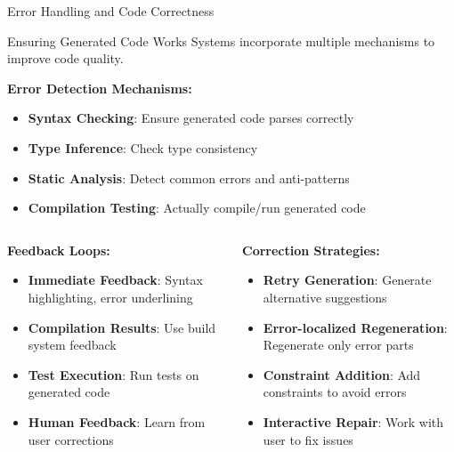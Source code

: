 \documentclass{beamer}
\begin{document}
\begin{frame}[t]{Error Handling and Code Correctness}
    \begin{block}{Ensuring Generated Code Works}
        Systems incorporate multiple mechanisms to improve code quality.
    \end{block}
    
    \textbf{Error Detection Mechanisms:}
    \begin{itemize}
        \item \textbf{Syntax Checking}: Ensure generated code parses correctly
        \item \textbf{Type Inference}: Check type consistency
        \item \textbf{Static Analysis}: Detect common errors and anti-patterns
        \item \textbf{Compilation Testing}: Actually compile/run generated code
    \end{itemize}
    
    \begin{columns}[t]
        \begin{column}{0.5\textwidth}
            \textbf{Feedback Loops:}
            \begin{itemize}
                \item \textbf{Immediate Feedback}: Syntax highlighting, error underlining
                \item \textbf{Compilation Results}: Use build system feedback
                \item \textbf{Test Execution}: Run tests on generated code
                \item \textbf{Human Feedback}: Learn from user corrections
            \end{itemize}
        \end{column}
        \begin{column}{0.5\textwidth}
            \textbf{Correction Strategies:}
            \begin{itemize}
                \item \textbf{Retry Generation}: Generate alternative suggestions
                \item \textbf{Error-localized Regeneration}: Regenerate only error parts
                \item \textbf{Constraint Addition}: Add constraints to avoid errors
                \item \textbf{Interactive Repair}: Work with user to fix issues
            \end{itemize}
        \end{column}
    \end{columns}
\end{frame}
\end{document}
